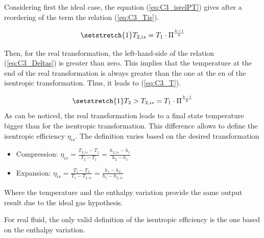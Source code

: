 Considering first the ideal case, the equation (\ref{eq:C3_isrelPT}) gives after a reordering of the term the relation (\ref{eq:C3_Tis}).

\begin{equation}
\setstretch{1}
T_{2,is} = T_1\cdot\Pi^\frac{k-1}{k}\label{eq:C3_Tis}
\end{equation}

Then, for the real transformation, the left-hand-side of the relation (\ref{eq:C3_Deltas}) is greater than zero. This implies that the temperature at the end of the real transformation is always greater than the one at the en of the isentropic transformation. Thus, it leads to (\ref{eq:C3_T}).

\begin{equation}
\setstretch{1}
T_{2} > T_{2,is} = T_1\cdot\Pi^\frac{k-1}{k}\label{eq:C3_T}
\end{equation}
As can be noticed, the real transformation leads to a final state temperature bigger than for the isentropic transformation. This difference allows to define the isentropic efficiency $\eta_{is}$. The definition varies based on the desired transformation
\begin{itemize}
\item Compression: $\eta_{is}=\frac{T_{2,is}-T_1}{T_2-T_1}=\frac{h_{2,is}-h_1}{h_2-h_1}$
\item Expansion: $\eta_{is}=\frac{T_1-T_{2}}{T_1-T_{2,is}}=\frac{h_1-h_{2}}{h_1-h_{2,is}}$
\end{itemize}
Where the temperature and the enthalpy variation provide the same output result due to the ideal gas hypothesis. 

For real fluid, the only valid definition of the isentropic efficiency is the one based on the enthalpy variation. 